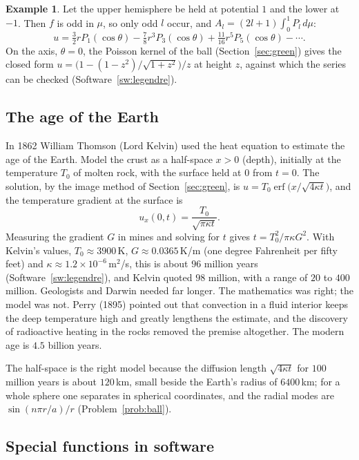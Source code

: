 \documentclass[11pt,a4paper]{article}
\numberwithin{equation}{section}
\theoremstyle{definition}
\newtheorem{exa}[thm]{Example}
\begin{document}
\begin{exa}
\label{ex:hemispheres}
Let the upper hemisphere be held at potential $1$ and the lower at $-1$. Then $f$ is odd in $\mu$, so only odd $l$ occur, and $A_l = (2l + 1)\int_0^1P_l\,d\mu$:
\[
u = \tfrac32rP_1(\cos\theta) - \tfrac78r^3P_3(\cos\theta) + \tfrac{11}{16}r^5P_5(\cos\theta) - \cdots .
\]
On the axis, $\theta = 0$, the Poisson kernel of the ball (Section~\ref{sec:green}) gives the closed form $u = \bigl(1 - (1 - z^2)/\sqrt{1 + z^2}\bigr)/z$ at height $z$, against which the series can be checked (Software~\ref{sw:legendre}).
\end{exa}

\subsection{The age of the Earth}
\label{ssec:kelvin}

In 1862 William Thomson (Lord Kelvin) used the heat equation to estimate the age of the Earth. Model the crust as a half-space $x > 0$ (depth), initially at the temperature $T_0$ of molten rock, with the surface held at $0$ from $t = 0$. The solution, by the image method of Section~\ref{sec:green}, is
$u = T_0\operatorname{erf}\bigl(x/\sqrt{4\kappa t}\bigr)$, and the temperature gradient at the surface is
\[
u_x(0, t) = \frac{T_0}{\sqrt{\pi\kappa t}} .
\]
Measuring the gradient $G$ in mines and solving for $t$ gives $t = T_0^2/\pi\kappa G^2$. With Kelvin's values, $T_0 \approx 3900$\,K, $G \approx 0.0365$\,K/m (one degree Fahrenheit per fifty feet) and $\kappa \approx 1.2 \times 10^{-6}$\,m$^2$/s, this is about $96$ million years (Software~\ref{sw:legendre}), and Kelvin
quoted $98$ million, with a range of $20$ to $400$ million. Geologists and Darwin needed far longer. The mathematics was right; the model was not. Perry (1895) pointed out that convection in a fluid interior keeps the deep temperature high and greatly lengthens the estimate, and the discovery of radioactive heating
in the rocks removed the premise altogether. The modern age is $4.5$ billion years.

The half-space is the right model because the diffusion length $\sqrt{4\kappa t}$ for $100$ million years is about $120$\,km, small beside the Earth's radius of $6400$\,km; for a whole sphere one separates in spherical coordinates, and the radial modes are $\sin(n\pi r/a)/r$ (Problem~\ref{prob:ball}).

\subsection{Special functions in software}
\label{ssec:software11}
\end{document}
